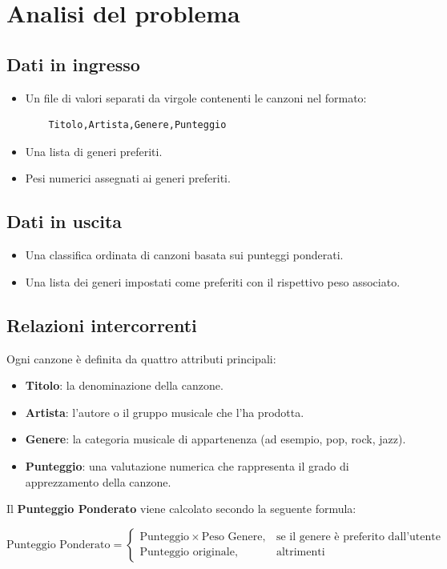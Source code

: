 \documentclass[a4paper,11pt]{article}
\begin{document}
\newpage
\section{Analisi del problema}
\subsection{Dati in ingresso}
\begin{itemize}
    \item Un file di valori separati da virgole contenenti le canzoni nel formato:
    \begin{verbatim}
    Titolo,Artista,Genere,Punteggio
    \end{verbatim}
    \item Una lista di generi preferiti.
    \item Pesi numerici assegnati ai generi preferiti.
\end{itemize}

\subsection{Dati in uscita}
\begin{itemize}
    \item Una classifica ordinata di canzoni basata sui punteggi ponderati.
    \item Una lista dei generi impostati come preferiti con il rispettivo peso associato.
\end{itemize}

\subsection{Relazioni intercorrenti}
Ogni canzone è definita da quattro attributi principali:
\begin{itemize}
    \item \textbf{Titolo}: la denominazione della canzone.  
    \item \textbf{Artista}: l’autore o il gruppo musicale che l’ha prodotta.  
    \item \textbf{Genere}: la categoria musicale di appartenenza (ad esempio, pop, rock, jazz).  
    \item \textbf{Punteggio}: una valutazione numerica che rappresenta il grado di apprezzamento della canzone.  
\end{itemize}

Il \textbf{Punteggio Ponderato} viene calcolato secondo la seguente formula:
\begin{center}
    \textit{
    \[
    \text{Punteggio Ponderato} =
    \begin{cases} 
      \text{Punteggio} \times \text{Peso Genere}, & \text{se il genere è preferito dall’utente} \\
      \text{Punteggio originale}, & \text{altrimenti}
    \end{cases}
    \]
    }
\end{center}
\end{document}
